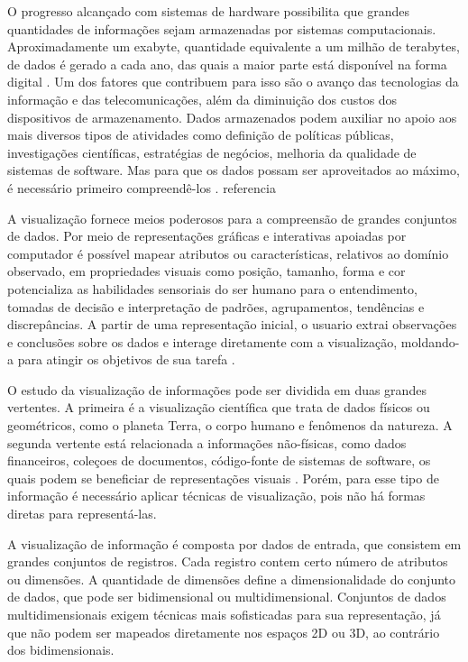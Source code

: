 O progresso alcançado com sistemas de hardware possibilita que grandes quantidades de informações sejam armazenadas por sistemas computacionais. Aproximadamente um exabyte, quantidade equivalente a um milhão de terabytes, de dados é gerado a cada ano, das quais a maior parte está disponível na forma digital \cite{keim2002information}. Um dos fatores que contribuem para isso são o avanço das tecnologias da informação e das telecomunicações, além da diminuição dos custos dos dispositivos de armazenamento. Dados armazenados podem auxiliar no apoio aos mais diversos tipos de atividades como definição de políticas públicas, investigações científicas, estratégias de negócios, melhoria da qualidade de sistemas de software. Mas para que os dados possam ser aproveitados ao máximo, é necessário primeiro compreendê-los \cite{heer2012interactive}. referencia

A visualização fornece meios poderosos para a compreensão de grandes conjuntos de dados. Por meio de representações gráficas e interativas apoiadas por computador é possível mapear atributos ou características, relativos ao domínio observado, em propriedades visuais como posição, tamanho, forma e cor potencializa as habilidades sensoriais do ser humano para o entendimento, tomadas de decisão e interpretação de padrões, agrupamentos, tendências e discrepâncias. A partir de uma representação inicial, o usuario extrai observações e conclusões sobre os dados e interage diretamente com a visualização, moldando-a para atingir os objetivos de sua tarefa \cite{rafaelmessiasmartins2012}.

O estudo da visualização de informações pode ser dividida em duas grandes vertentes. A primeira é a visualização científica que trata de dados físicos ou geométricos, como o planeta Terra, o corpo humano e fenômenos da natureza. A segunda vertente está relacionada a informações não-físicas, como dados financeiros, coleçoes de documentos, código-fonte de sistemas de software, os quais podem se beneficiar de representações visuais \cite{rafaelmessiasmartins2012}. Porém, para esse tipo de informação é necessário aplicar técnicas de visualização, pois não há formas diretas para representá-las. %

A visualização de informação é composta por dados de entrada, que consistem em grandes conjuntos de registros. Cada registro contem certo número de atributos ou dimensões. A quantidade de dimensões define a dimensionalidade do conjunto de dados, que pode ser bidimensional ou multidimensional. Conjuntos de dados multidimensionais exigem técnicas mais sofisticadas para sua representação, já que não podem ser mapeados diretamente nos espaços 2D ou 3D, ao contrário dos bidimensionais.

